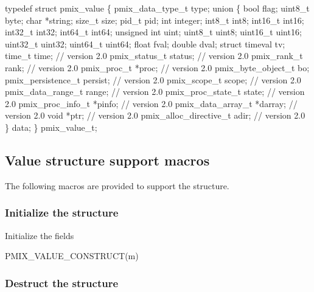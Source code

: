 \cspecificstart
\begin{codepar}
typedef struct pmix_value \{
    pmix_data_type_t type;
    union \{
        bool flag;
        uint8_t byte;
        char *string;
        size_t size;
        pid_t pid;
        int integer;
        int8_t int8;
        int16_t int16;
        int32_t int32;
        int64_t int64;
        unsigned int uint;
        uint8_t uint8;
        uint16_t uint16;
        uint32_t uint32;
        uint64_t uint64;
        float fval;
        double dval;
        struct timeval tv;
        time_t time;                    // version 2.0
        pmix_status_t status;           // version 2.0
        pmix_rank_t rank;               // version 2.0
        pmix_proc_t *proc;              // version 2.0
        pmix_byte_object_t bo;
        pmix_persistence_t persist;     // version 2.0
        pmix_scope_t scope;             // version 2.0
        pmix_data_range_t range;        // version 2.0
        pmix_proc_state_t state;        // version 2.0
        pmix_proc_info_t *pinfo;        // version 2.0
        pmix_data_array_t *darray;      // version 2.0
        void *ptr;                      // version 2.0
        pmix_alloc_directive_t adir;    // version 2.0
    \} data;
\} pmix_value_t;
\end{codepar}
\cspecificend

\subsection{Value structure support macros}
The following macros are provided to support the  structure.

\subsubsection{Initialize the  structure}

Initialize the  fields

\cspecificstart
\begin{codepar}
PMIX_VALUE_CONSTRUCT(m)
\end{codepar}
\cspecificend

\begin{arglist}
\end{arglist}

\subsubsection{Destruct the  structure}

